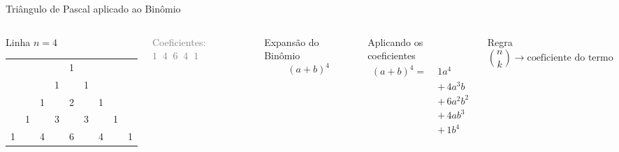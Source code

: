 \documentclass[9pt]{beamer}
\begin{document}
\begin{frame}{Triângulo de Pascal aplicado ao Binômio}

\begin{columns}


\begin{block}{Linha $n = 4$}
\begin{center}
\begin{tabular}{ccccccccc}
 &  &  &  & 1 &  &  &  &  \\
 &  &  & 1 &  & 1 &  &  &  \\
 &  & 1 &  & 2 &  & 1 &  &  \\
 & 1 &  & 3 &  & 3 &  & 1 &  \\
1 &  & 4 &  & \alert{6} &  & 4 &  & 1 \\
\end{tabular}
\end{center}
\end{block}

\vspace{0.3cm}

\textcolor{gray}{Coeficientes: $1 \;\; 4 \;\; 6 \;\; 4 \;\; 1$}


\begin{block}{Expansão do Binômio}
\[
(a + b)^4
\]
\end{block}

\vspace{0.3cm}

\begin{alertblock}{Aplicando os coeficientes}
\[
\begin{aligned}
(a + b)^4 =\;&
1a^4 \\
&+\, 4a^3b \\
&+\, 6a^2b^2 \\
&+\, 4ab^3 \\
&+\, 1b^4
\end{aligned}
\]
\end{alertblock}

\vspace{0.3cm}

\begin{block}{Regra}
\[
\binom{n}{k} \rightarrow \text{coeficiente do termo}
\]
\end{block}

\end{columns}

\end{frame}
\end{document}
